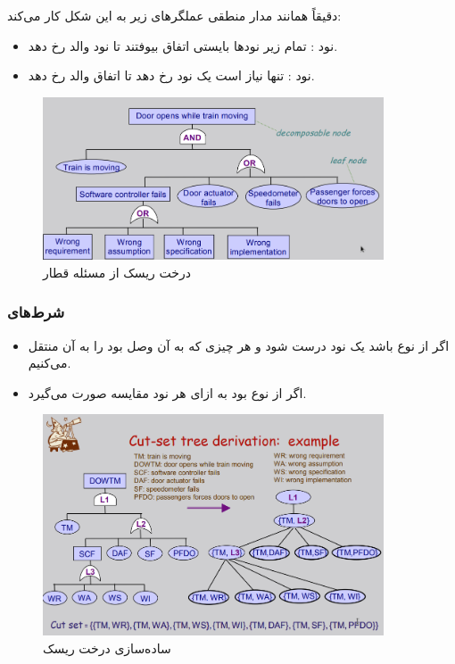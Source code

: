 دقیقاً همانند مدار منطقی عملگر‌های زیر به این شکل کار می‌کند:

\begin{itemize}
    \item نود : تمام زیر نود‌ها بایستی اتفاق بیوفتند تا نود والد رخ دهد.
    \item نود : تنها نیاز است یک نود رخ دهد تا اتفاق والد رخ دهد.
\end{itemize}

\begin{figure}[H]
    \centering
    \includegraphics[width=0.9\textwidth]{images/risk_tree_sample.png}
    \caption{درخت ریسک از مسئله قطار}
\end{figure}

\subsubsection{شرط‌های }

\begin{itemize}
    \item اگر از نوع  باشد یک نود درست شود و هر چیزی که به آن وصل بود را
    به آن منتقل می‌کنیم.
    \item اگر از نوع  بود به ازای هر نود مقایسه  صورت می‌گیرد.
\end{itemize}

\begin{figure}[H]
    \centering
    \includegraphics[width=0.9\textwidth]{images/cutset_risk_tree.png}
    \caption{ساده‌سازی درخت ریسک}
\end{figure}

